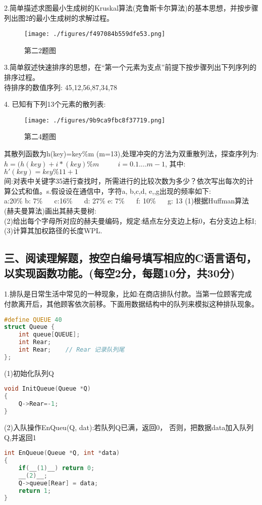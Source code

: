 2.简单描述求图最小生成树的Kruskal算法(克鲁斯卡尔算法)的基本思想，并按步骤列出图2的最小生成树的求解过程。
\begin{figure}[ht]
\centering
\texttt{[image: ./figures/f497084b559dfe53.png]}
\caption{第二2题图} \label{fig_SYDS11_2}
\end{figure}

3.简单叙述快速排序的思想，在“第一个元素为支点”前提下按步骤列出下列序列的排序过程。 \\
待排序的数值序列: 45,12,56,87,34,78


4. 已知有下列13个元素的散列表:
\begin{figure}[ht]
\centering
\texttt{[image: ./figures/9b9ca9fbc8f37719.png]}
\caption{第二4题图} \label{fig_SYDS11_3}
\end{figure}
其散列函数为h(key)=key\%m (m=13),处理冲突的方法为双重散列法，探查序列为: \\
$h=(h(key)+i*(key)\%m$  $\qquad$ $i=0.1.... m-1$, 其中:$h'(key)=key\%11+1$ \\
间:对表中关键字35进行查找时，所需进行的比较次数为多少？依次写出每次的计算公式和值。s.假设设在通信中，字符a, b,c,d, e,,g出现的频率如下: \\
a:20\% b: 7\% $\quad$ c:16\% $\quad$ d: 27\% e: 7\% $\quad$ f: 10\% $\quad$ g: 13%
(1)根据Huffman算法(赫夫曼算法)画出其赫夫曼树: \\
(2)给出每个字母所对应的赫夫曼编码，规定:结点左分支边上标0，右分支边上标I;  \\
(3)计算其加权路径的长度WPL.

\subsection{三、阅读理解题，按空白编号填写相应的C语言语句，以实现函数功能。(每空2分，每题10分，共30分)}

1.排队是日常生活中常见的一种现象，比如:在商店排队付款。当第一位顾客完成付款离开后，其他顾客依次前移。下面用数据结构中的队列来模拟这种排队现象。
\begin{lstlisting}[language=cpp]
#define QUEUE 40
struct Queue {
    int queue[QUEUE];
    int Rear;
    int Rear;    // Rear 记录队列尾
};
\end{lstlisting}
(1)初始化队列Q
\begin{lstlisting}[language=cpp]
void InitQueue(Queue *Q)
{
    Q->Rear=-1;
}
\end{lstlisting}

(2)入队操作EnQueu(Q, dat):若队列Q已满，返回0， 否则，把数据data加入队列Q,并返回1
\begin{lstlisting}[language=cpp]
int EnQueue(Queue *Q, int *data)
{
    if(__(1)__) return 0;
    __(2)__;
    Q->queue[Rear] = data;
    return 1;
}
\end{lstlisting}

